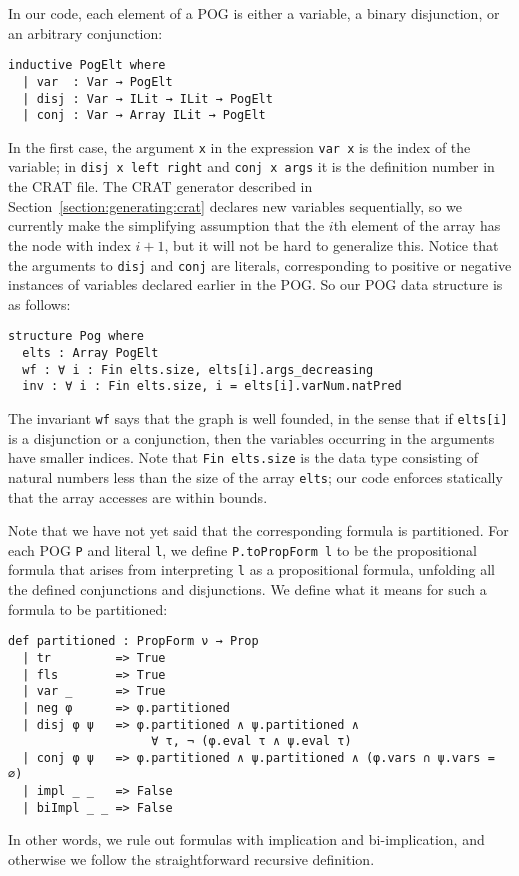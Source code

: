 In our code, each element of a POG  is either a variable, a binary disjunction, or an arbitrary conjunction:
\begin{lstlisting}
inductive PogElt where
  | var  : Var → PogElt
  | disj : Var → ILit → ILit → PogElt
  | conj : Var → Array ILit → PogElt
\end{lstlisting}
In the first case, the argument \lstinline{x} in the expression
\lstinline{var x} is the index
of the variable; in \lstinline{disj x left right} and \lstinline{conj x args}
it is the definition number in the CRAT file.
The CRAT generator described in Section~\ref{section:generating:crat}
declares new variables sequentially, so we currently make the simplifying assumption
that the $i$th element of the array has the node with index $i + 1$,
but it will not be hard to generalize this.
Notice that the arguments to \lstinline{disj} and \lstinline{conj} are literals,
corresponding to positive or negative instances of variables declared earlier in the POG.
So our POG data structure is as follows:
\begin{lstlisting}
structure Pog where
  elts : Array PogElt
  wf : ∀ i : Fin elts.size, elts[i].args_decreasing
  inv : ∀ i : Fin elts.size, i = elts[i].varNum.natPred
\end{lstlisting}
The invariant \lstinline{wf} says that the graph is well founded, in the
sense that if \lstinline{elts[i]} is a disjunction
or a conjunction, then the variables occurring in the arguments have smaller indices.
Note that \lstinline{Fin elts.size} is the data type consisting of natural numbers
less than the size of the array \lstinline{elts}; our code enforces statically
that the array accesses are within bounds.

Note that we have not yet said that the corresponding formula is partitioned.
For each POG \lstinline{P} and literal \lstinline{l}, we define
\lstinline{P.toPropForm l} to be the
propositional formula that arises from interpreting \lstinline{l} as a propositional
formula, unfolding all the defined conjunctions and disjunctions. We define
what it means for such a formula to be partitioned:
\begin{lstlisting}
def partitioned : PropForm ν → Prop
  | tr         => True
  | fls        => True
  | var _      => True
  | neg φ      => φ.partitioned
  | disj φ ψ   => φ.partitioned ∧ ψ.partitioned ∧
                    ∀ τ, ¬ (φ.eval τ ∧ ψ.eval τ)
  | conj φ ψ   => φ.partitioned ∧ ψ.partitioned ∧ (φ.vars ∩ ψ.vars = ∅)
  | impl _ _   => False
  | biImpl _ _ => False
\end{lstlisting}
In other words, we rule out formulas with implication and bi-implication, and otherwise we follow the straightforward recursive definition.

